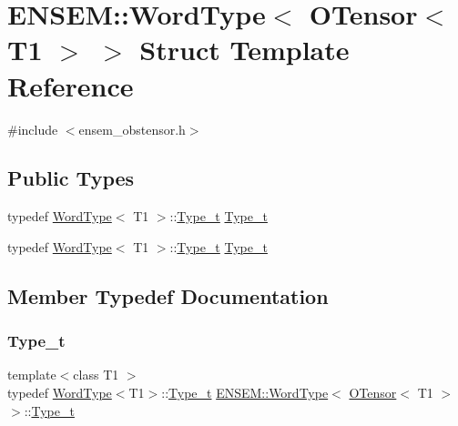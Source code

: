 \hypertarget{structENSEM_1_1WordType_3_01OTensor_3_01T1_01_4_01_4}{}\section{E\+N\+S\+EM\+:\+:Word\+Type$<$ O\+Tensor$<$ T1 $>$ $>$ Struct Template Reference}
\label{structENSEM_1_1WordType_3_01OTensor_3_01T1_01_4_01_4}


{\ttfamily \#include $<$ensem\+\_\+obstensor.\+h$>$}

\subsection*{Public Types}
\begin{DoxyCompactItemize}
\item 
typedef \mbox{\hyperlink{structENSEM_1_1WordType}{Word\+Type}}$<$ T1 $>$\+::\mbox{\hyperlink{structENSEM_1_1WordType_3_01OTensor_3_01T1_01_4_01_4_a7eb2940d941e35ae189a26d059d7668b}{Type\+\_\+t}} \mbox{\hyperlink{structENSEM_1_1WordType_3_01OTensor_3_01T1_01_4_01_4_a7eb2940d941e35ae189a26d059d7668b}{Type\+\_\+t}}
\item 
typedef \mbox{\hyperlink{structENSEM_1_1WordType}{Word\+Type}}$<$ T1 $>$\+::\mbox{\hyperlink{structENSEM_1_1WordType_3_01OTensor_3_01T1_01_4_01_4_a7eb2940d941e35ae189a26d059d7668b}{Type\+\_\+t}} \mbox{\hyperlink{structENSEM_1_1WordType_3_01OTensor_3_01T1_01_4_01_4_a7eb2940d941e35ae189a26d059d7668b}{Type\+\_\+t}}
\end{DoxyCompactItemize}


\subsection{Member Typedef Documentation}
\mbox{\label{structENSEM_1_1WordType_3_01OTensor_3_01T1_01_4_01_4_a7eb2940d941e35ae189a26d059d7668b}} 
\subsubsection{\texorpdfstring{Type\_t}{Type\_t}\hspace{0.1cm}{\footnotesize\ttfamily [1/2]}}
{\footnotesize\ttfamily template$<$class T1 $>$ \\
typedef \mbox{\hyperlink{structENSEM_1_1WordType}{Word\+Type}}$<$T1$>$\+::\mbox{\hyperlink{structENSEM_1_1WordType_3_01OTensor_3_01T1_01_4_01_4_a7eb2940d941e35ae189a26d059d7668b}{Type\+\_\+t}} \mbox{\hyperlink{structENSEM_1_1WordType}{E\+N\+S\+E\+M\+::\+Word\+Type}}$<$ \mbox{\hyperlink{classENSEM_1_1OTensor}{O\+Tensor}}$<$ T1 $>$ $>$\+::\mbox{\hyperlink{structENSEM_1_1WordType_3_01OTensor_3_01T1_01_4_01_4_a7eb2940d941e35ae189a26d059d7668b}{Type\+\_\+t}}}

